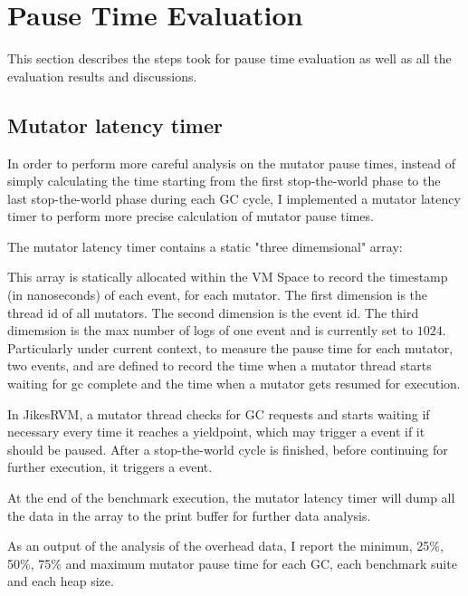 \section{Pause Time Evaluation} %
\label{sec:pausetime}

This section describes the steps took for pause time evaluation as well as
all the evaluation results and discussions.

\subsection{Mutator latency timer}

In order to perform more careful analysis on the mutator pause times, instead of
simply calculating the time starting from the first stop-the-world phase to the last
stop-the-world phase during each GC cycle, I implemented a mutator latency timer
to perform more precise calculation of mutator pause times.

The mutator latency timer contains a static "three dimemsional" array:\\
\centerline{}
This array is statically allocated within the VM Space to record the timestamp (in nanoseconds)
of each event, for each mutator. The first dimension is the thread id of all
mutators. The second dimension is the event id. The third dimemsion  is the
max number of logs of one event and is currently set to $1024$. Particularly under
current context, to measure the pause time for each mutator, two events,
 and  are defined to record the time when a
mutator thread starts waiting for gc complete and the time when a mutator gets resumed for execution.

In JikesRVM, a mutator thread checks for GC requests and starts waiting if necessary every
time it reaches a yieldpoint, which may trigger a  event if it should
be paused. After a stop-the-world cycle is finished, before continuing for further execution,
it triggers a  event.

At the end of the benchmark execution, the mutator latency timer will dump all the
data in the  array to the print buffer for further data analysis.

As an output of the analysis of the overhead data, I report the minimun, 25\%, 50\%,
75\% and maximum mutator pause time for each GC, each benchmark suite and each heap size.

